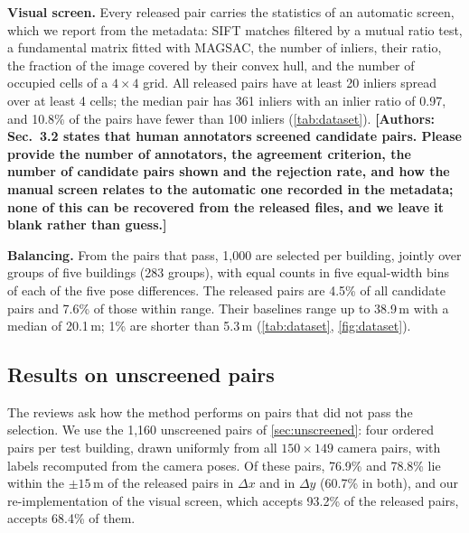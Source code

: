 \documentclass[10pt,twocolumn,letterpaper]{article}
\newcommand{\todoauthors}[1]{\textbf{\color{red}[Authors: #1]}}
\begin{document}
\noindent\textbf{Visual screen.} Every released pair carries the statistics of an automatic screen, which we report from the metadata: SIFT matches filtered by a mutual ratio test, a fundamental matrix fitted with MAGSAC, the number of inliers, their ratio, the fraction of the image covered by their convex hull, and the number of occupied cells of a $4{\times}4$ grid. All released pairs have at least 20 inliers spread over at least 4 cells; the median pair has 361 inliers with an inlier ratio of 0.97, and 10.8\% of the pairs have fewer than 100 inliers (\cref{tab:dataset}). \todoauthors{Sec.~3.2 states that human annotators screened candidate pairs. Please provide the number of annotators, the agreement criterion, the number of candidate pairs shown and the rejection rate, and how the manual screen relates to the automatic one recorded in the metadata; none of this can be recovered from the released files, and we leave it blank rather than guess.}

\noindent\textbf{Balancing.} From the pairs that pass, 1{,}000 are selected per building, jointly over groups of five buildings (283 groups), with equal counts in five equal-width bins of each of the five pose differences. The released pairs are 4.5\% of all candidate pairs and 7.6\% of those within range. Their baselines range up to 38.9\,m with a median of 20.1\,m; 1\% are shorter than 5.3\,m (\cref{tab:dataset}, \cref{fig:dataset}).

\subsection{Results on unscreened pairs}
\label{sec:unfiltered}

The reviews ask how the method performs on pairs that did not pass the selection. We use the 1{,}160 unscreened pairs of \cref{sec:unscreened}: four ordered pairs per test building, drawn uniformly from all $150{\times}149$ camera pairs, with labels recomputed from the camera poses. Of these pairs, 76.9\% and 78.8\% lie within the $\pm15$\,m of the released pairs in $\Delta x$ and in $\Delta y$ (60.7\% in both), and our re-implementation of the visual screen, which accepts 93.2\% of the released pairs, accepts 68.4\% of them.
\end{document}
